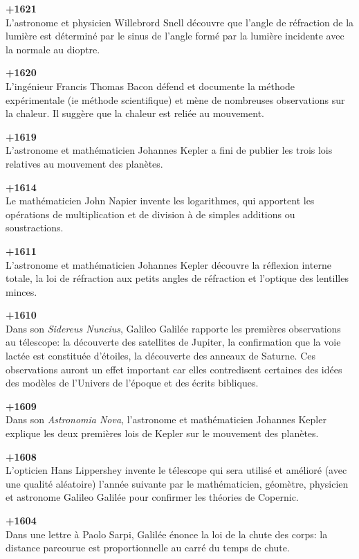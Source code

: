 \textbf{+1621}\\
L'astronome et physicien Willebrord Snell découvre que l'angle de réfraction de la lumière est déterminé par le sinus de l'angle formé par la lumière incidente avec la normale au dioptre.

\textbf{+1620}\\
L'ingénieur Francis Thomas Bacon défend et documente la méthode expérimentale (ie méthode scientifique) et mène de nombreuses observations sur la chaleur. Il suggère que la chaleur est reliée au mouvement.

\textbf{+1619}\\
L'astronome et mathématicien Johannes Kepler a fini de publier les trois lois relatives au mouvement des planètes.

\textbf{+1614}\\
Le mathématicien John Napier invente les logarithmes, qui apportent les opérations de multiplication et de division à de simples additions ou soustractions.

\textbf{+1611}\\
L'astronome et mathématicien Johannes Kepler découvre la réflexion interne totale, la loi de réfraction aux petits angles de réfraction et l'optique des lentilles minces.

\textbf{+1610}\\ 
Dans son \textit{Sidereus Nuncius}, Galileo Galilée rapporte les premières observations au télescope: la découverte des satellites de Jupiter, la confirmation que la voie lactée est constituée d'étoiles, la découverte des anneaux de Saturne. Ces observations auront un effet important car elles contredisent certaines des idées des modèles de l'Univers de l'époque et des écrits bibliques.

\textbf{+1609}\\
Dans son \textit{Astronomia Nova}, l'astronome et mathématicien Johannes Kepler explique les deux premières lois de Kepler sur le mouvement des planètes.

\textbf{+1608}\\
L'opticien Hans Lippershey invente le télescope qui sera utilisé et amélioré (avec une qualité aléatoire) l'année suivante par le mathématicien, géomètre, physicien et astronome Galileo Galilée pour confirmer les théories de Copernic.

\textbf{+1604}\\
Dans une lettre à Paolo Sarpi, Galilée énonce la loi de la chute des corps: la distance parcourue est proportionnelle au carré du temps de chute.

